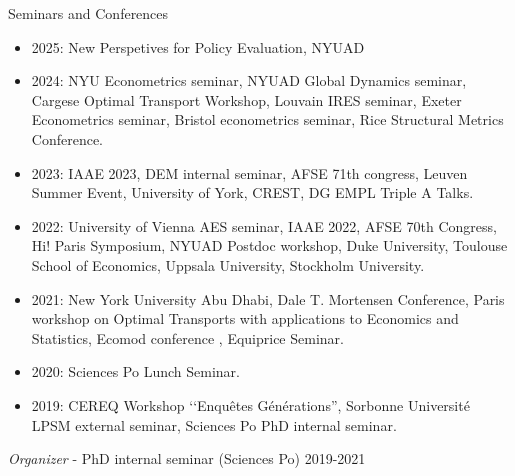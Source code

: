 \documentclass{resume} %
\begin{document}
\begin{rSection}{Seminars and Conferences}
\begin{itemize}
  \item 2025: New Perspetives for Policy Evaluation, NYUAD
  \item 2024: NYU Econometrics seminar, NYUAD Global Dynamics seminar, Cargese Optimal Transport Workshop, Louvain IRES seminar, Exeter Econometrics seminar, Bristol econometrics seminar, Rice Structural Metrics Conference.  
  \item 2023: IAAE 2023, DEM internal seminar, AFSE 71th congress, Leuven Summer Event, University of York, CREST, DG EMPL Triple A Talks.
  \item 2022: University of Vienna AES seminar, IAAE 2022, AFSE 70th Congress, Hi! Paris Symposium, NYUAD Postdoc workshop, Duke University, Toulouse School of Economics, Uppsala University, Stockholm University.
  \item 2021: New York University Abu Dhabi, Dale T. Mortensen Conference, Paris workshop on Optimal Transports with applications to Economics and Statistics, Ecomod conference , Equiprice Seminar.
  \item 2020: Sciences Po Lunch Seminar.
  \item 2019: CEREQ Workshop ‘‘Enquêtes Générations'', Sorbonne Université LPSM external seminar, Sciences Po PhD internal seminar.
\end{itemize}

{\em Organizer} - PhD internal seminar (Sciences Po) \hfill {2019-2021}

\end{rSection}
\end{document}
